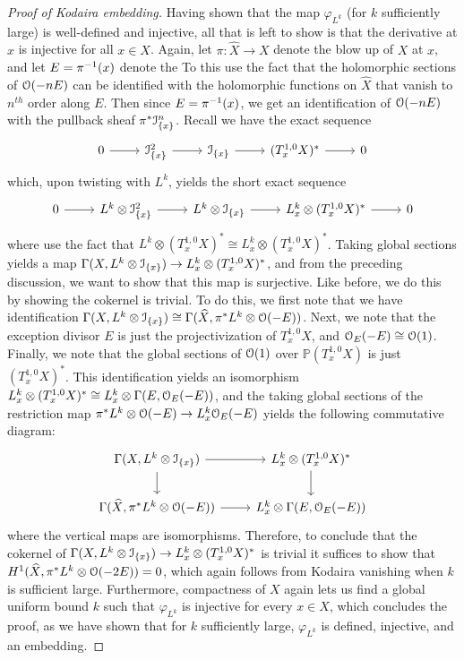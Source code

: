 \begin{proof}[Proof of Kodaira embedding]
Having shown that the map $\varphi_{L^k}$ (for $k$ sufficiently large)
is well-defined and injective, all that is left to show is that the derivative
at $x$ is injective for all $x \in X$. Again, let $\pi : \widehat{X} \to X$ denote the
blow up of $X$ at $x$, and let $E = \pi^{-1}(x)$ denote the
To this use the fact that the holomorphic
sections of $\mathcal{O}(-nE)$ can be identified with the holomorphic functions on
$\widehat{X}$ that vanish to $n^{th}$ order along $E$. Then since $E = \pi^{-1}(x)$,
we get an identification of $\mathcal{O}(-nE)$ with the pullback sheaf
$\pi^*\mathcal{I}_{\left\lbrace x \right\rbrace}^n$. Recall we have the exact sequence
\[\begin{tikzcd}
0 \ar[r] & \mathcal{I}^2_{\set{x}} \ar[r] & \mathcal{I}_{\set{x}}
\ar[r] & (T^{1,0}_xX)^* \ar[r] & 0
\end{tikzcd}\]
which, upon twisting with $L^k$, yields the short exact sequence
\[\begin{tikzcd}
0 \ar[r] & L^k \otimes \mathcal{I}^2_{\set{x}} \ar[r] & L^k \otimes \mathcal{I}_{\set{x}}
\ar[r] & L^k_x \otimes (T^{1,0}_xX)^* \ar[r] & 0
\end{tikzcd}\]
where use the fact that $L^k \otimes (T^{1,0}_xX)^* \cong L^k_x \otimes (T^{1,0}_xX)^*$.
Taking global sections yields a map
$\Gamma(X, L^k\otimes\mathcal{I}_{\left\lbrace x \right\rbrace}) \to L^k_x \otimes (T^{1,0}_xX)^*$, and
from the preceding discussion, we want to show that this map is surjective.
Like before, we do this by showing the cokernel is trivial. To do this, we first note
that we have identification
$\Gamma(X,L^k\otimes\mathcal{I}_{\left\lbrace x \right\rbrace})\cong\Gamma(\widehat{X},\pi^*L^k\otimes\mathcal{O}(-E))$.
Next, we note that the exception divisor $E$ is just the projectivization
of $T_x^{1,0}X$, and $\mathcal{O}_E(-E) \cong \mathcal{O}(1)$. Finally, we note that the global sections
of $\mathcal{O}(1)$ over $\mathbb{P}(T_x^{1,0}X)$ is just $(T^{1,0}_xX)^*$. This identification
yields an isomorphism
$L^k_x \otimes (T^{1,0}_xX)^* \cong L^k_x \otimes \Gamma(E,\mathcal{O}_E(-E))$,
and the taking global sections of the restriction map
$\pi^*L^k\otimes\mathcal{O}(-E) \to L^k_x\mathcal{O}_E(-E)$ yields the following commutative diagram:
\[\begin{tikzcd}
\Gamma(X, L^k \otimes \mathcal{I}_{\set{x}}) \ar[d]\ar[r] &
L^k_x \otimes (T^{1,0}_xX)^* \ar[d]\\
\Gamma(\widehat{X},\pi^*L^k\otimes\O(-E)) \ar[r] & L^k_x \otimes \Gamma(E,\O_E(-E))
\end{tikzcd}\]
where the vertical maps are isomorphisms. Therefore, to conclude that the
cokernel of $\Gamma(X, L^k\otimes\mathcal{I}_{\left\lbrace x \right\rbrace}) \to L^k_x \otimes (T^{1,0}_xX)^*$
is trivial it suffices to show that $H^1(\widehat{X}, \pi^*L^k\otimes\mathcal{O}(-2E)) = 0$,
which again follows from Kodaira vanishing when $k$ is sufficient large. Furthermore,
compactness of $X$ again lets us find a global uniform bound $k$ such that
$\varphi_{L^k}$ is injective for every $x \in X$, which concludes the proof,
as we have shown that for $k$ sufficiently large, $\varphi_{L^k}$ is defined,
injective, and an embedding.
\end{proof}
%